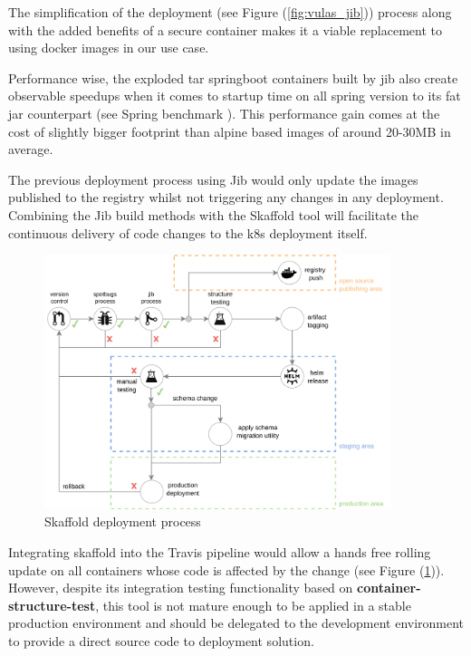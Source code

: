 \documentclass[11pt]{article}
\begin{document}
The simplification of the deployment (see Figure (\ref{fig:vulas_jib})) process along with the added benefits of a secure container makes it a viable replacement to using docker images in our use case. 

Performance wise, the exploded tar springboot containers built by jib also create observable speedups when it comes to startup time on all spring version to its fat jar counterpart  (see Spring benchmark \cite{SPRINGBENCH}). This performance gain comes at the cost of slightly bigger footprint than alpine based images of around 20-30MB in average. 


\vspace{-5mm}\hspace{5mm} The previous deployment process using Jib would only update the images published to the registry whilst not triggering any changes in any deployment. Combining the Jib build methods with the Skaffold tool will facilitate the continuous delivery of code changes to the k8s deployment itself. 

\begin{figure}[h]
    \centering
    \includegraphics[width=0.9\textwidth]{vulas_skaffold.png}
    \caption{Skaffold deployment process}
    \label{fig:vulas_skaffold}
    \vspace{-3mm}
\end{figure}

Integrating skaffold into the Travis pipeline would allow a hands free rolling update on all containers whose code is affected by the change (see Figure (\ref{fig:vulas_skaffold})). However, despite its integration testing functionality based on \textbf{container-structure-test}, this tool is not mature enough to be applied in a stable production environment and should be delegated to the development environment to provide a direct source code to deployment solution. 
\end{document}
